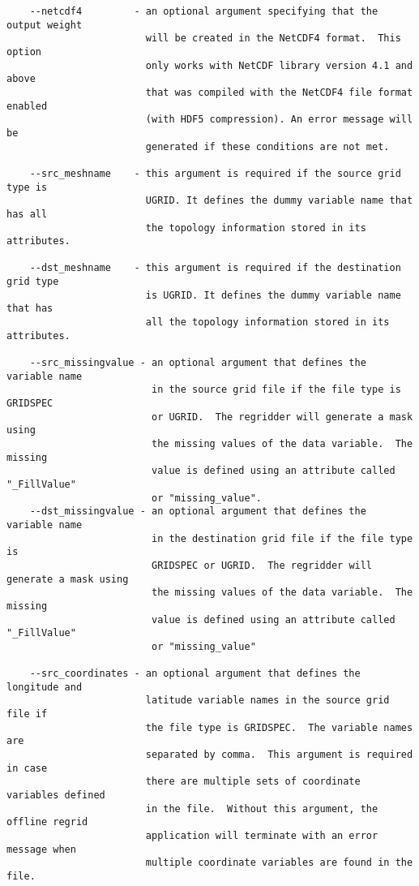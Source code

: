 \begin{verbatim}
    --netcdf4         - an optional argument specifying that the output weight
                        will be created in the NetCDF4 format.  This option 
                        only works with NetCDF library version 4.1 and above 
                        that was compiled with the NetCDF4 file format enabled 
                        (with HDF5 compression). An error message will be 
                        generated if these conditions are not met.

    --src_meshname    - this argument is required if the source grid type is
                        UGRID. It defines the dummy variable name that has all
                        the topology information stored in its attributes.

    --dst_meshname    - this argument is required if the destination grid type
                        is UGRID. It defines the dummy variable name that has
                        all the topology information stored in its attributes.

    --src_missingvalue - an optional argument that defines the variable name 
                         in the source grid file if the file type is GRIDSPEC 
                         or UGRID.  The regridder will generate a mask using 
                         the missing values of the data variable.  The missing 
                         value is defined using an attribute called "_FillValue" 
                         or "missing_value". 
    --dst_missingvalue - an optional argument that defines the variable name
                         in the destination grid file if the file type is
                         GRIDSPEC or UGRID.  The regridder will generate a mask using
                         the missing values of the data variable.  The missing
                         value is defined using an attribute called "_FillValue"
                         or "missing_value"

    --src_coordinates - an optional argument that defines the longitude and
                        latitude variable names in the source grid file if
                        the file type is GRIDSPEC.  The variable names are
                        separated by comma.  This argument is required in case
                        there are multiple sets of coordinate variables defined
                        in the file.  Without this argument, the offline regrid
                        application will terminate with an error message when
                        multiple coordinate variables are found in the file.


\end{verbatim}
